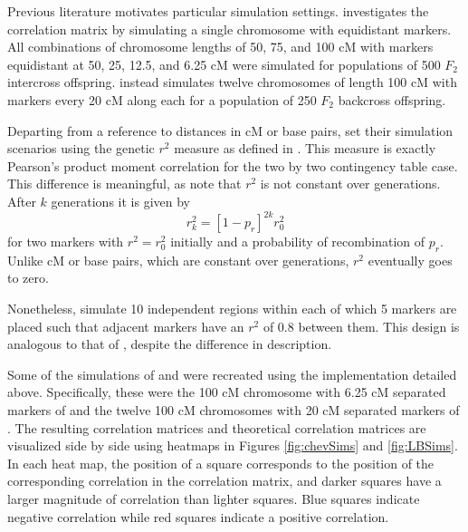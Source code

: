 \documentclass{article}
\begin{document}
Previous literature motivates particular simulation settings. \cite{cheverud2001} investigates the correlation matrix by simulating a single chromosome with equidistant markers. All combinations of chromosome lengths of 50, 75, and 100 cM with markers equidistant at 50, 25, 12.5, and 6.25 cM were simulated for populations of 500 $F_2$ intercross offspring. \cite{LanderBotstein1989} instead simulates twelve chromosomes of length 100 cM with markers every 20 cM along each for a population of 250 $F_2$ backcross offspring.

Departing from a reference to distances in cM or base pairs, \cite{LiJi2005} set their simulation scenarios using the genetic $r^2$ measure as defined in \cite{hillrobertson1968}. This measure is exactly Pearson's product moment correlation for the two by two contingency table case.
This difference is meaningful, as \cite{siegmundyakir2007} note that $r^2$ is not constant over generations. After $k$ generations it is given by
$$r_k^2 = \left [ 1 - p_r \right ]^{2k}  r^2_0$$
for two markers with $r^2 = r^2_0$ initially and a probability of recombination of $p_r$. Unlike cM or base pairs, which are constant over generations, $r^2$ eventually goes to zero.

Nonetheless, \cite{LiJi2005} simulate 10 independent regions within each of which 5 markers are placed such that adjacent markers have an $r^2$ of 0.8 between them. This design is analogous to that of \cite{LanderBotstein1989}, despite the difference in description.

Some of the simulations of \cite{cheverud2001} and \cite{LanderBotstein1989} were recreated using the implementation detailed above. Specifically, these were the 100 cM chromosome with 6.25 cM separated markers of \cite{cheverud2001} and the twelve 100 cM chromosomes with 20 cM separated markers of \cite{LanderBotstein1989}. The resulting correlation matrices and theoretical correlation matrices are visualized side by side using heatmaps in Figures \ref{fig:chevSims} and \ref{fig:LBSims}. In each heat map, the position of a square corresponds to the position of the corresponding correlation in the correlation matrix, and darker squares have a larger magnitude of correlation than lighter squares. Blue squares indicate negative correlation while red squares indicate a positive correlation.
\end{document}
